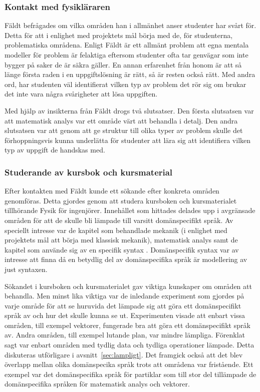 \begin{draft}
\subsubsection{Kontakt med fysikläraren}
\label{sec:kontakt_faldt}

Fäldt befrågades om vilka områden han i allmänhet anser studenter har
svårt för. Detta för att i enlighet med projektets mål börja med de, för
studenterna, problematiska områdena. Enligt Fäldt är ett allmänt problem att
egna mentala modeller för problem är felaktiga eftersom studenter ofta tar
genvägar som inte bygger på saker de är säkra gäller. En annan erfarenhet
från honom är att så länge första raden i en uppgiftslösning är rätt, så är
resten också rätt. Med andra ord, har studenten väl identifierat vilken typ av
problem det rör sig om brukar det inte vara några svårigheter att lösa
uppgiften.

Med hjälp av insikterna från Fäldt drogs två slutsatser. Den första slutsatsen
var att matematisk analys var ett område värt att behandla i detalj. Den andra
slutsatsen var att genom att ge struktur till olika typer av problem skulle det
förhoppningsvis kunna underlätta för studenter att lära sig att identifiera vilken
typ av uppgift de handskas med.

\subsubsection{Studerande av kursbok och kursmaterial}

Efter kontakten med Fäldt kunde ett sökande efter konkreta områden genomföras.
Detta gjordes genom att studera kursboken och kursmaterialet tillhörande Fysik
för ingenjörer. Innehållet som hittades delades upp i avgränsade områden för att
de skulle bli lämpade till varsitt domänspecifikt språk. Av speciellt intresse
var de kapitel som behandlade mekanik (i enlighet med projektets mål att börja
med klassisk mekanik), matematisk analys samt de kapitel som använde sig av en
specifik syntax . Domänspecifik syntax var av intresse att finna
då en betydlig del av domänspecifika språk är modellering av just syntaxen.

Sökandet i kursboken och kursmaterialet gav viktiga kunskaper om områden att
behandla. Men minst lika viktiga var de inledande experiment som gjordes på
varje område för att se huruvida det lämpade sig att göra ett domänspecifikt
språk av och hur det skulle kunna se ut. Experimenten visade att enbart vissa
områden, till exempel vektorer, fungerade bra att göra ett domänspecifikt språk
av. Andra områden, till exempel lutande plan, var mindre lämpliga. Förenklat
sagt var enbart områden med tydlig data och tydliga operationer lämpade. Detta
diskuteras utförligare i avsnitt~\ref{sec:lampligt}. Det framgick också att det
blev överlapp mellan olika domänspecika språk trots att områdena var fristående.
Ett exempel var det domänspecifika språk för partiklar som till stor del
tillämpade de domänspecifika språken för matematisk analys och vektorer.


\end{draft}
